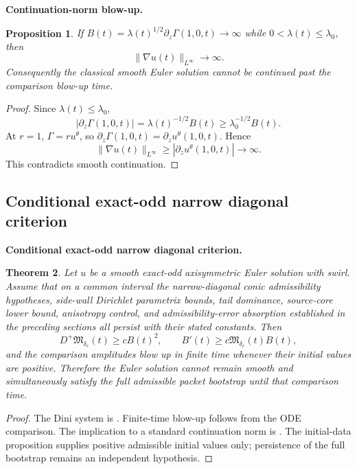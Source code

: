 \documentclass[11pt]{amsart}
\newtheorem{theorem}{Theorem}[section]
\newtheorem{proposition}[theorem]{Proposition}
\begin{document}
\medskip
\noindent\textbf{Continuation-norm blow-up.}
\begin{proposition}\label{prop:continuation_norm_blowup}
If \(B(t)=\lambda(t)^{1/2}\partial_z\Gamma(1,0,t)\to\infty\) while \(0<\lambda(t)\le\lambda_0\), then
\[
\|\nabla u(t)\|_{L^\infty}\to\infty.
\]
Consequently the classical smooth Euler solution cannot be continued past the comparison blow-up time.
\end{proposition}

\begin{proof}
Since \(\lambda(t)\le\lambda_0\),
\[
|\partial_z\Gamma(1,0,t)|
=\lambda(t)^{-1/2}B(t)
\ge
\lambda_0^{-1/2}B(t).
\]
At \(r=1\), \(\Gamma=r u^\theta\), so \(\partial_z\Gamma(1,0,t)=\partial_z u^\theta(1,0,t)\).  Hence
\[
\|\nabla u(t)\|_{L^\infty}
\ge
|\partial_z u^\theta(1,0,t)|
\to\infty.
\]
This contradicts smooth continuation.
\end{proof}

\subsection{Conditional exact-odd narrow diagonal criterion}

\medskip
\noindent\textbf{Conditional exact-odd narrow diagonal criterion.}
\begin{theorem}\label{thm:final_narrow_diag_blowup_criterion}
Let $u$ be a smooth exact-odd axisymmetric Euler solution with swirl.  Assume that on a common interval the narrow-diagonal conic admissibility hypotheses, side-wall Dirichlet parametrix bounds, tail dominance, source-core lower bound, anisotropy control, and admissibility-error absorption established in the preceding sections all persist with their stated constants.  Then
\[
D^+\mathfrak M_{\delta_c}(t)\ge cB(t)^2,
\qquad
B'(t)\ge c\mathfrak M_{\delta_c}(t)B(t),
\]
and the comparison amplitudes blow up in finite time whenever their initial values are positive.  Therefore the Euler solution cannot remain smooth and simultaneously satisfy the full admissible packet bootstrap until that comparison time.
\end{theorem}

\begin{proof}
The Dini system is .  Finite-time blow-up follows from the ODE comparison.  The implication to a standard continuation norm is .  The initial-data proposition supplies positive admissible initial values only; persistence of the full bootstrap remains an independent hypothesis.
\end{proof}
\end{document}
